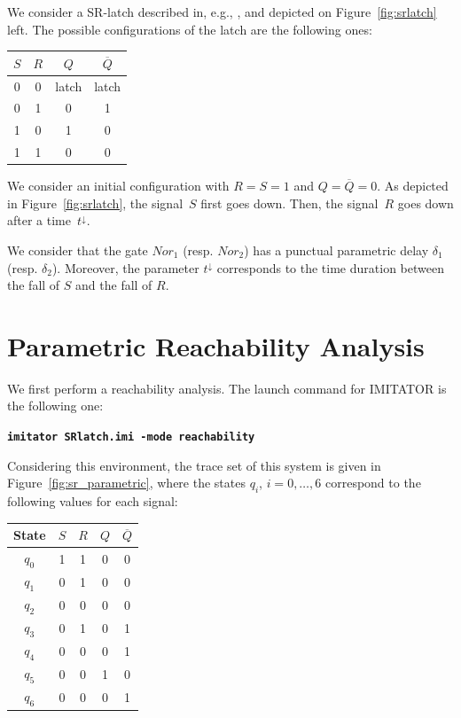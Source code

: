 \documentclass[a4paper,11pt]{report}
\newcommand{\imitator}{\textsf{IMITATOR}}
\newcommand{\imitatorExec}{\code{imitator}}
\newcommand{\code}[1]{\textbf{\texttt{#1}}}
\begin{document}
We consider a SR-latch described in, e.g., \cite{hh07}, and depicted on Figure~\ref{fig:srlatch} left.
The possible configurations of the latch are the following ones:

\smallskip

{

\centering

\begin{tabular}{|c|c|c|c|}
	\hline
	$S$ & $R$ & $Q$ & $\overline{Q}$ \\
	\hline
	0 & 0 & latch & latch \\
	\hline
	0 & 1 & 0 & 1 \\
	\hline
	1 & 0 & 1 & 0 \\
	\hline
	1 & 1 & 0 & 0 \\
	\hline
\end{tabular}

}

\medskip

We consider an initial configuration with $R = S = 1$ and $Q = \overline{Q} = 0$.
As depicted in Figure~\ref{fig:srlatch}, the signal~$S$ first goes down.
Then, the signal~$R$ goes down after a time~$t^\downarrow$.


We consider that the gate $\mathit{Nor}_1$ (resp. $\mathit{Nor}_2$) has a punctual parametric delay $\delta_1$ (resp. $\delta_2$).
Moreover, the parameter $t^\downarrow$ corresponds to the time duration between the fall of $S$ and the fall of $R$.


\section{Parametric Reachability Analysis}

We first perform a reachability analysis.
The launch command for \imitator{} is the following one:

\code{\imitatorExec{} SRlatch.imi -mode reachability}

Considering this environment, the trace set of this system is given in Figure~\ref{fig:sr_parametric}, where the states $q_i$, $i = 0, \dots, 6$ correspond to the following values for each signal:

\smallskip

{

\centering

\begin{tabular}{|c||c|c|c|c|}
	\hline
	State & $S$ & $R$ & $Q$ & $\overline{Q}$ \\
	\hline
	$q_0$ & 1 & 1 & 0 & 0 \\
	\hline
	$q_1$ & 0 & 1 & 0 & 0 \\
	\hline
	$q_2$ & 0 & 0 & 0 & 0 \\
	\hline
	$q_3$ & 0 & 1 & 0 & 1 \\
	\hline
	$q_4$ & 0 & 0 & 0 & 1 \\
	\hline
	$q_5$ & 0 & 0 & 1 & 0 \\
	\hline
	$q_6$ & 0 & 0 & 0 & 1 \\
	\hline
\end{tabular}

}
\end{document}

